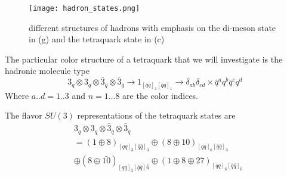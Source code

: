 \begin{figure}[h]
    \texttt{[image: hadron\_states.png]}
    \caption{different structures of hadrons with emphasis on the di-meson state in (g) and the tetraquark state in (c)}\label{fig:figure6}
    \end{figure}
The particular color structure of a tetraquark that we will investigate is the hadronic molecule type 
\begin{equation}
    3_q \otimes 3_q \otimes \bar{3}_{\bar{q}} \otimes \bar{3}_{\bar{q}} \rightarrow 1_{[\bar{q}q]_1[\bar{q}q]_1} \rightarrow \delta_{ab} \delta_{cd} \times \bar{q}^aq^b\bar{q}^cq^d 
\end{equation}
Where $a..d = 1..3$ and $n=1...8$ are the color indices. 

The flavor $SU(3)$ representations of the tetraquark states are \cite{sym15071298}
\begin{align}
& 3_q \otimes 3_q \otimes \bar{3}_{\bar{q}} \otimes \bar{3}_{\bar{q}} \nonumber \\
& = (1 \oplus 8)_{[qq]_{\bar{3}}[\bar{q}\bar{q}]_3} \oplus (8 \oplus 10)_{[qq]_6[\bar{q}\bar{q}]_3} \nonumber \\
& \oplus (8 \oplus \bar{10})_{[qq]_{\bar{3}}[\bar{q}\bar{q}]\bar{6}} \oplus (1 \oplus 8 \oplus 27)_{[qq]_6[\bar{q}\bar{q}]_{\bar{6}}}
\end{align} 


